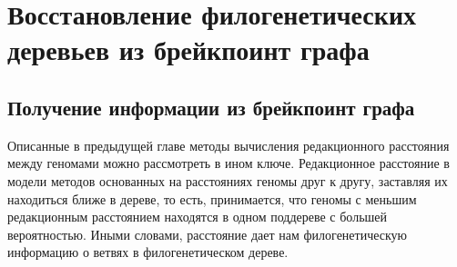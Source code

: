 \chapter{Восстановление филогенетических деревьев из брейкпоинт графа}

\section{Получение информации из брейкпоинт графа}
Описанные в предыдущей главе методы вычисления редакционного расстояния между геномами можно рассмотреть в ином ключе.
Редакционное расстояние в модели методов основанных на расстояниях  геномы друг к другу, заставляя их находиться ближе в дереве, то есть,
принимается, что геномы с меньшим редакционным расстоянием находятся в одном поддереве с большей вероятностью.
Иными словами, расстояние дает нам филогенетическую информацию о ветвях в филогенетическом дереве.

